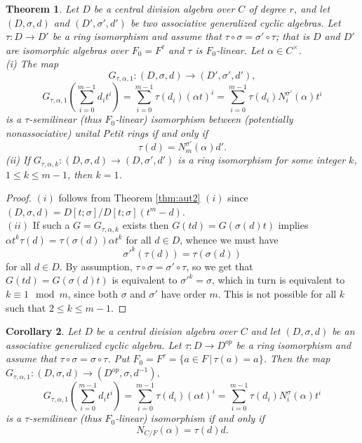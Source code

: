 \documentclass{amsart}
\theoremstyle{plain}
\newtheorem{theorem}{Theorem}[section]
\newtheorem{corollary}[theorem]{Corollary}
\theoremstyle{definition}
\numberwithin{equation}{section}
\numberwithin{figure}{section}
\begin{document}
\begin{theorem} \label{thm:autcor}
Let $D$ be a central division algebra over $C$ of degree $r$, and let $(D, \sigma, d)$ and $(D', \sigma', d')$ be two associative  generalized cyclic  algebras. Let $\tau:D\to D'$ be a ring isomorphism and assume that $\tau\circ\sigma=\sigma'\circ \tau$; that is $D$ and $D'$ are isomorphic algebras over  $F_0=F^\tau$ and  $\tau$ is  $F_0$-linear. Let  $\alpha\in C^\times$.
  \\ (i)
   The map
   $$ G_{\tau,\alpha,1}: (D, \sigma, d)\to (D', \sigma', d'),$$
   $$G_{\tau,\alpha,1}(\sum_{i=0}^{m-1}d_it^i)=\sum_{i=0}^{m-1}\tau(d_i) (\alpha t)^i= \sum_{i=0}^{m-1}\tau(d_i) N_i^{\sigma'}(\alpha) t^i $$
    is a $\tau$-semilinear (thus $F_0$-linear) isomorphism between (potentially nonassociative) unital Petit rings if and only if
$$\tau(d) =N^{\sigma'}_{m}(\alpha) d'.$$
(ii) If $G_{\tau,\alpha,k}:(D, \sigma, d)\to (D, \sigma', d')$  is a ring isomorphism for some integer $k$, $1\leq k\leq m-1$, then $k=1$.
 \end{theorem}

\begin{proof}
 $(i)$ follows from Theorem \ref{thm:aut2} $(i)$ since  $(D, \sigma, d)=D[t;\sigma]/D[t;\sigma](t^m-d)$.
 \\ $(ii)$
 If such a $G=G_{\tau,\alpha,k}$ exists then $G(td)=G(\sigma(d)t)$ implies $\alpha t^k \tau(d) = \tau(\sigma(d)) \alpha t^k$ for all $d\in D$, whence we must have
$$
{\sigma'}^k(\tau(d)) = \tau(\sigma(d))
$$
for all $d\in D$.  By assumption, $\tau\circ \sigma=\sigma'\circ \tau$, so we get that $G(td)=G(\sigma(d)t)$ is equivalent to ${\sigma'}^k = \sigma$, which in turn is equivalent to $k \equiv 1 \mod m$, since both $\sigma$ and $\sigma'$ have order $m$. This is not possible for all $k$ such that $2\leq k\leq m-1$.
\end{proof}


\begin{corollary}\label{cor:maingeneralized1}
Let  $D$ be a central division algebra over $C$ and let $(D, \sigma, d)$  be an associative  generalized cyclic  algebra.
Let $\tau:D\to D^{op}$ be a ring isomorphism and assume that $\tau\circ\sigma=\sigma\circ \tau$. Put $F_0=F^\tau=\{a\in F\,|\,\tau(a)=a \}$.
Then the map $ G_{\tau,\alpha,1}: (D,\sigma,d)\to (D^{op},\sigma,d^{-1}),$
   $$G_{\tau,\alpha,1}(\sum_{i=0}^{m-1}d_it^i)=\sum_{i=0}^{m-1}\tau(d_i) (\alpha t)^i= \sum_{i=0}^{m-1}\tau(d_i) N_i^\sigma(\alpha) t^i $$
    is a $\tau$-semilinear (thus $F_0$-linear) isomorphism
     if and only if
$$N_{C/F}(\alpha) = \tau(d) d.$$
\end{corollary}
\end{document}
